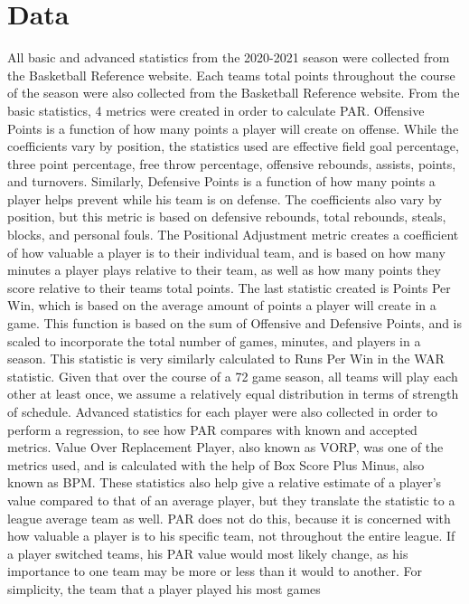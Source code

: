 \documentclass[12pt, titlepage]{article}
\begin{document}
\section{Data}
All basic and advanced statistics from the 2020-2021 season were collected from the Basketball Reference 
website. Each teams total points throughout the course of the season were also collected from the 
Basketball Reference website. From the basic statistics, 4 metrics were created in order to calculate PAR. 
Offensive Points is a function of how many points a player will create on offense. While the coefficients vary 
by position, the statistics used are effective field goal percentage, three point percentage, free throw 
percentage, offensive rebounds, assists, points, and turnovers. Similarly, Defensive Points is a function of 
how many points a player helps prevent while his team is on defense. The coefficients also vary by position, 
but this metric is based on defensive rebounds, total rebounds, steals, blocks, and personal fouls. The 
Positional Adjustment metric creates a coefficient of how valuable a player is to their individual team, and is 
based on how many minutes a player plays relative to their team, as well as how many points they score 
relative to their teams total points. The last statistic created is Points Per Win, which is based on the 
average amount of points a player will create in a game. This function is based on the sum of Offensive and 
Defensive Points, and is scaled to incorporate the total number of games, minutes, and players in a season. 
This statistic is very similarly calculated to Runs Per Win in the WAR statistic. Given that over the course of 
a 72 game season, all teams will play each other at least once, we assume a relatively equal distribution in 
terms of strength of schedule. Advanced statistics for each player were also collected in order to perform a 
regression, to see how PAR compares with known and accepted metrics. Value Over Replacement Player, 
also known as VORP, was one of the metrics used, and is calculated with the help of Box Score Plus 
Minus, also known as BPM. These statistics also help give a relative estimate of a player's value compared 
to that of an average player, but they translate the statistic to a league average team as well. PAR does not 
do this, because it is concerned with how valuable a player is to his specific team, not throughout the entire 
league. If a player switched teams, his PAR value would most likely change, as his importance to one team 
may be more or less than it would to another. For simplicity, the team that a player played his most games 
\end{document}
